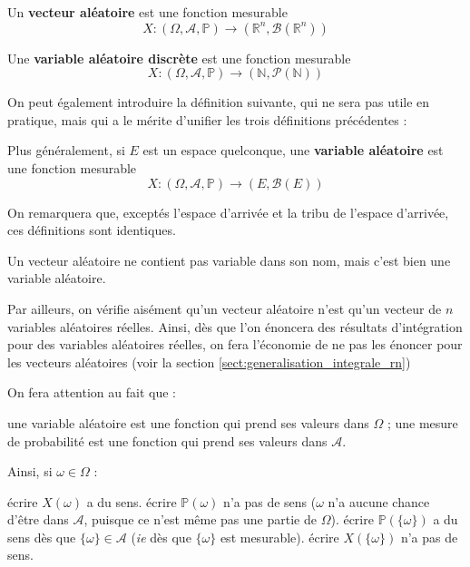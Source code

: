 \documentclass[../integ-proba.tex]{subfiles}
\begin{document}
\begin{defi}
    Un \textbf{vecteur aléatoire} est une fonction mesurable
    $$X:\left(\Omega, \mathcal{A}, \mathbb{P}\right) \longrightarrow \left(\mathbb{R}^n, \mathcal{B}(\mathbb{R}^n)\right)$$
\end{defi}

\begin{defi}
    Une \textbf{variable aléatoire discrète} est une fonction mesurable
    $$X:\left(\Omega, \mathcal{A}, \mathbb{P}\right) \longrightarrow \left(\mathbb{N}, \mathcal{P}(\mathbb{N})\right)$$
\end{defi}

On peut également introduire la définition suivante, qui ne sera pas utile en pratique, mais qui a le mérite d'unifier les trois définitions précédentes :

\begin{defi}
    Plus généralement, si $E$ est un espace quelconque, une \textbf{variable aléatoire} est une fonction mesurable
    $$X:\left(\Omega, \mathcal{A}, \mathbb{P}\right) \longrightarrow \left(E, \mathcal{B}(E)\right)$$
\end{defi}

\begin{rem}
    On remarquera que, exceptés l'espace d'arrivée et la tribu de l'espace d'arrivée, ces définitions sont identiques.
\end{rem}

\begin{rem}
    \label{rem:vect_alea_idem_var}
    Un vecteur aléatoire ne contient pas \og variable \fg dans son nom, mais c'est bien une variable aléatoire.
    
    Par ailleurs, on vérifie aisément qu'un vecteur aléatoire n'est qu'un vecteur de $n$ variables aléatoires réelles.
    Ainsi, dès que l'on énoncera des résultats d'intégration pour des variables aléatoires réelles, on fera l'économie de ne pas les énoncer pour les vecteurs aléatoires (voir la section \ref{sect:generalisation_integrale_rn})
\end{rem}

\begin{rem}
    On fera attention au fait que :
    \begin{itemize}
        \itemb une variable aléatoire est une fonction qui prend ses valeurs dans $\Omega$ ;
        \itemb une mesure de probabilité est une fonction qui prend ses valeurs dans $\mathcal{A}$.
    \end{itemize}
    Ainsi, si $\omega \in \Omega$ :
    \begin{itemize}
        \itemb écrire $X(\omega)$ a du sens.
        \itemb écrire $\mathbb{P}(\omega)$ n'a pas de sens ($\omega$ n'a aucune chance d'être dans $\mathcal{A}$, puisque ce n'est même pas une partie de $\Omega$).
        \itemb écrire $\mathbb{P}(\{\omega\})$ a du sens dès que $\{\omega\}\in \mathcal{A}$ (\textit{ie} dès que $\{\omega\}$ est mesurable).
        \itemb écrire $X(\{\omega\})$ n'a pas de sens.
    \end{itemize}
\end{rem}
\end{document}
